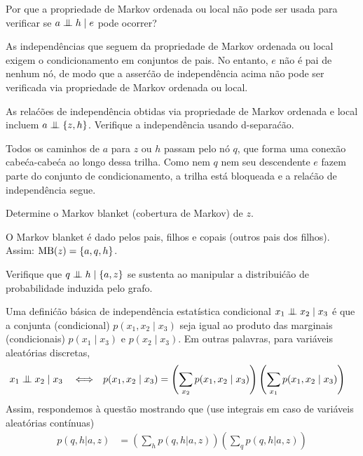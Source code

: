 \begin{exenumerate}
    \item Por que a propriedade de Markov ordenada ou local n\~ao pode ser usada para verificar se $a \mathrel{\perp\mspace{-10mu}\perp} h \mid e$ pode ocorrer? 
    \begin{solution}
        As independ\^encias que seguem da propriedade de Markov ordenada ou local exigem o condicionamento em conjuntos de pais. No entanto, $e$ n\~ao \'e pai de nenhum n\'o, de modo que a asser\'c\~ao de independ\^encia acima n\~ao pode ser verificada via propriedade de Markov ordenada ou local. 
    \end{solution}
    
    \item As rela\'c\~oes de independ\^encia obtidas via propriedade de Markov ordenada e local incluem $a \mathrel{\perp\mspace{-10mu}\perp} \{z,h\}$. Verifique a independ\^encia usando d-separa\'c\~ao.
    
    \begin{solution}
        Todos os caminhos de $a$ para $z$ ou $h$ passam pelo n\'o $q$, que forma uma conex\~ao cabe\'ca-cabe\'ca ao longo dessa trilha. Como nem $q$ nem seu descendente $e$ fazem parte do conjunto de condicionamento, a trilha est\'a bloqueada e a rela\'c\~ao de independ\^encia segue.
    \end{solution}
    
    
    \item Determine o Markov blanket (cobertura de Markov) de $z$.
    \begin{solution}
        O Markov blanket \'e dado pelos pais, filhos e copais (outros pais dos filhos). Assim: $\textrm{MB}(z) = \{a,q,h\}$.
    \end{solution}
    
    
    \item Verifique que $ q \mathrel{\perp\mspace{-10mu}\perp}  h \mid \{a,z\}$ se sustenta ao manipular a distribui\'c\~ao de probabilidade induzida pelo grafo.
    \begin{solution}
        
        Uma defini\'c\~ao b\'asica de independ\^encia estat\'istica condicional $x_1
        \mathrel{\perp\mspace{-10mu}\perp} x_2 \mid x_3$ \'e que a conjunta (condicional)
        $p(x_1, x_2 \mid x_3)$ seja igual ao produto das marginais
        (condicionais) $p(x_1 \mid x_3)$ e $p(x_2 \mid x_3)$. Em outras
        palavras, para vari\'aveis aleat\'orias discretas,
        \begin{align}
            x_1 &\mathrel{\perp\mspace{-10mu}\perp} x_2 \mid x_3 &  &\Longleftrightarrow &  p(x_1, x_2 \mid x_3) &= \left( \sum_{x_2}  p(x_1, x_2 \mid x_3) \right) \left( \sum_{x_1}  p(x_1, x_2 \mid x_3) \right)
        \end{align}
        Assim, respondemos \`a quest\~ao mostrando que (use integrais em
        caso de vari\'aveis aleat\'orias cont\'inuas)
        \begin{align}
            p(q,h | a,z) &= \left(\sum_h  p(q,h | a,z)\right) \left( \sum_q  p(q,h | a,z)\right)
        \end{align}
        

\end{solution}
\end{exenumerate}
